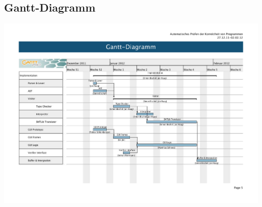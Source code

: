 \documentclass[10pt,a4paper,titlepage]{article}
\begin{document}
\begin{landscape}
\subsection{Gantt-Diagramm}
\includegraphics[scale=0.7]{images/Implementierung_Gantt.pdf}
\end{landscape}
\end{document}
